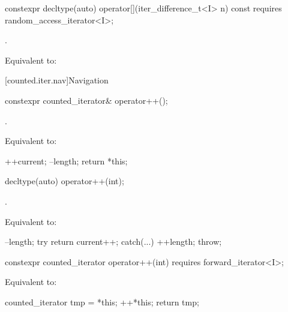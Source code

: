 %
\begin{itemdecl}
constexpr decltype(auto) operator[](iter_difference_t<I> n) const
  requires random_access_iterator<I>;
\end{itemdecl}

\begin{itemdescr}
\pnum
\expects
{}.

\pnum
\effects
Equivalent to: 
\end{itemdescr}

[counted.iter.nav]{Navigation}

%
\begin{itemdecl}
constexpr counted_iterator& operator++();
\end{itemdecl}

\begin{itemdescr}
\pnum
\expects
{}.

\pnum
\effects
Equivalent to:
\begin{codeblock}
++current;
--length;
return *this;
\end{codeblock}
\end{itemdescr}

%
\begin{itemdecl}
decltype(auto) operator++(int);
\end{itemdecl}

\begin{itemdescr}
\pnum
\expects
{}.

\pnum
\effects
Equivalent to:
\begin{codeblock}
--length;
try { return current++; }
catch(...) { ++length; throw; }
\end{codeblock}
\end{itemdescr}

%
\begin{itemdecl}
constexpr counted_iterator operator++(int)
  requires forward_iterator<I>;
\end{itemdecl}

\begin{itemdescr}
\pnum
\effects
Equivalent to:
\begin{codeblock}
counted_iterator tmp = *this;
++*this;
return tmp;
\end{codeblock}
\end{itemdescr}

